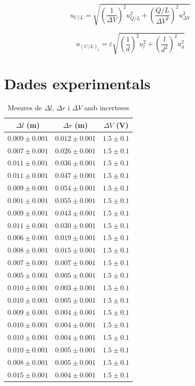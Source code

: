 \documentclass[11pt]{article}
\begin{document}
\begin{equation}
    u_{C/L} = \sqrt{
        \left( \frac{1}{\Delta V} \right)^2 u^2_{Q/L} +
        \left( \frac{Q/L}{\Delta V^2} \right)^2 u^2_{\Delta V}}
    \label{eq: ins_c}
\end{equation}

\begin{equation}
    u_{(C/L)_t} = \varepsilon \sqrt{
    \left( \frac{1}{d} \right)^2 u^2_l +
    \left( \frac{l}{d^2} \right)^2 u^2_d}
    \label{eq: ins_ct}
\end{equation}

\section{Dades experimentals}
\begin{table}[ht]
    \centering
    \begin{tabular}{ccc}
        \hline
        $\Delta l$ (m) & $\Delta r$ (m) & $\Delta V$ (V) \\
        \hline
        $0.009 \pm 0.001$ & $0.012 \pm 0.001$ & $1.5 \pm 0.1$ \\
        $0.007 \pm 0.001$ & $0.026 \pm 0.001$ & $1.5 \pm 0.1$ \\
        $0.011 \pm 0.001$ & $0.036 \pm 0.001$ & $1.5 \pm 0.1$ \\
        $0.011 \pm 0.001$ & $0.047 \pm 0.001$ & $1.5 \pm 0.1$ \\
        $0.009 \pm 0.001$ & $0.054 \pm 0.001$ & $1.5 \pm 0.1$ \\
        $0.001 \pm 0.001$ & $0.055 \pm 0.001$ & $1.5 \pm 0.1$ \\
        $0.009 \pm 0.001$ & $0.043 \pm 0.001$ & $1.5 \pm 0.1$ \\
        $0.011 \pm 0.001$ & $0.030 \pm 0.001$ & $1.5 \pm 0.1$ \\
        $0.006 \pm 0.001$ & $0.019 \pm 0.001$ & $1.5 \pm 0.1$ \\
        $0.008 \pm 0.001$ & $0.015 \pm 0.001$ & $1.5 \pm 0.1$ \\
        $0.007 \pm 0.001$ & $0.007 \pm 0.001$ & $1.5 \pm 0.1$ \\
        $0.005 \pm 0.001$ & $0.005 \pm 0.001$ & $1.5 \pm 0.1$ \\
        $0.010 \pm 0.001$ & $0.003 \pm 0.001$ & $1.5 \pm 0.1$ \\
        $0.010 \pm 0.001$ & $0.005 \pm 0.001$ & $1.5 \pm 0.1$ \\
        $0.009 \pm 0.001$ & $0.004 \pm 0.001$ & $1.5 \pm 0.1$ \\
        $0.010 \pm 0.001$ & $0.004 \pm 0.001$ & $1.5 \pm 0.1$ \\
        $0.010 \pm 0.001$ & $0.004 \pm 0.001$ & $1.5 \pm 0.1$ \\
        $0.010 \pm 0.001$ & $0.005 \pm 0.001$ & $1.5 \pm 0.1$ \\
        $0.008 \pm 0.001$ & $0.005 \pm 0.001$ & $1.5 \pm 0.1$ \\
        $0.015 \pm 0.001$ & $0.004 \pm 0.001$ & $1.5 \pm 0.1$ \\
        \hline
    \end{tabular}
    \caption{Mesures de $\Delta l$, $\Delta r$ i $\Delta V$ amb incerteses}
    \label{tab:mesures}
\end{table}
\end{document}
